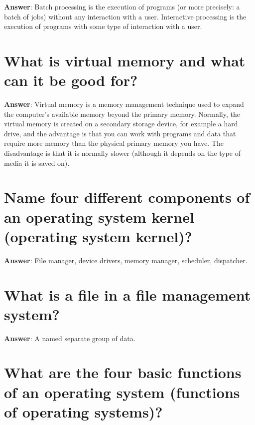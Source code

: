 \documentclass[a4paper,11pt,oneside]{book}
\begin{document}
\begin{sloppypar}
\label{q:112:sa:en:True}

\textbf{Answer}: Batch processing is the execution of programs (or more precisely: a batch of jobs) without any interaction with a user. Interactive processing is the execution of programs with some type of interaction with a user.



\section{What is virtual memory and what can it be good for?}

\label{q:113:sa:en:True}

\textbf{Answer}: Virtual memory is a memory management technique used to expand the computer's available memory beyond the primary memory. Normally, the virtual memory is created on a secondary storage device, for example a hard drive, and the advantage is that you can work with programs and data that require more memory than the physical primary memory you have. The disadvantage is that it is normally slower (although it depends on the type of media it is saved on).



\section{Name four different components of an operating system kernel (operating system kernel)?}

\label{q:114:sa:en:True}

\textbf{Answer}: File manager, device drivers, memory manager, scheduler, dispatcher.



\section{What is a file in a file management system?}

\label{q:115:sa:en:True}

\textbf{Answer}: A named separate group of data.



\section{What are the four basic functions of an operating system (functions of operating systems)?}

\label{q:116:sa:en:True}


\end{sloppypar}
\end{document}
